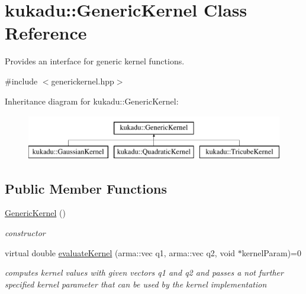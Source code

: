 \hypertarget{classkukadu_1_1GenericKernel}{\section{kukadu\-:\-:Generic\-Kernel Class Reference}
\label{classkukadu_1_1GenericKernel}
}


Provides an interface for generic kernel functions.  




{\ttfamily \#include $<$generickernel.\-hpp$>$}

Inheritance diagram for kukadu\-:\-:Generic\-Kernel\-:\begin{figure}[H]
\begin{center}
\leavevmode
\includegraphics[height=2.000000cm]{classkukadu_1_1GenericKernel}
\end{center}
\end{figure}
\subsection*{Public Member Functions}
\begin{DoxyCompactItemize}
\item 
\hypertarget{classkukadu_1_1GenericKernel_a9392e79e7da5d8473ac9e42f74e8ef3e}{\hyperlink{classkukadu_1_1GenericKernel_a9392e79e7da5d8473ac9e42f74e8ef3e}{Generic\-Kernel} ()}\label{classkukadu_1_1GenericKernel_a9392e79e7da5d8473ac9e42f74e8ef3e}

\begin{DoxyCompactList}\small\item\em constructor \end{DoxyCompactList}\item 
virtual double \hyperlink{classkukadu_1_1GenericKernel_a802a15e8fb5f863e798c9114be976045}{evaluate\-Kernel} (arma\-::vec q1, arma\-::vec q2, void $\ast$kernel\-Param)=0
\begin{DoxyCompactList}\small\item\em computes kernel values with given vectors q1 and q2 and passes a not further specified kernel parameter that can be used by the kernel implementation \end{DoxyCompactList}\end{DoxyCompactItemize}


